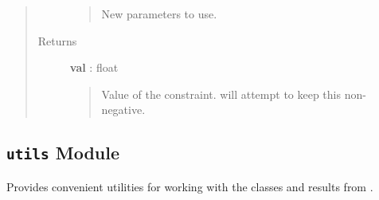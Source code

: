 \documentclass[letterpaper,10pt,english]{sphinxmanual}
\begin{document}
\begin{fulllineitems}
\begin{fulllineitems}
\begin{quote}
\begin{description}
\begin{quote}
New parameters to use.
\end{quote}

\item[{Returns }] \leavevmode
\textbf{val} : float
\begin{quote}

Value of the constraint.  will attempt to keep
this non-negative.
\end{quote}

\end{description}\end{quote}

\end{fulllineitems}


\end{fulllineitems}



\subsection{\texttt{utils} Module}
\label{gptools:utils-module}\label{gptools:module-gptools.utils}
Provides convenient utilities for working with the classes and results from .
\end{document}
